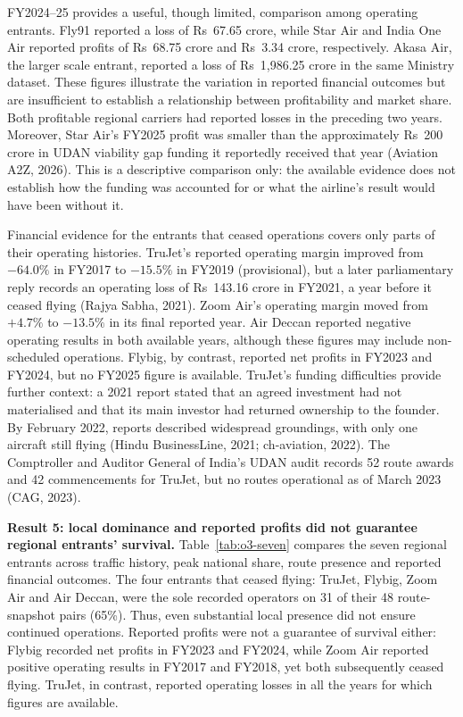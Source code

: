 \documentclass[12pt,a4paper]{article}
\newenvironment{authorcontribution}[1]{\par\begingroup\colorlet{currentAuthor}{#1}\color{#1}\captionsetup{font+={color=#1}}}{\par\endgroup}
\begin{document}
\begin{authorcontribution}{authorSweta}
FY2024--25 provides a useful, though limited, comparison among operating entrants. Fly91 reported a loss of Rs~67.65 crore, while Star Air and India One Air reported profits of Rs~68.75 crore and Rs~3.34 crore, respectively. Akasa Air, the larger scale entrant, reported a loss of Rs~1,986.25 crore in the same Ministry dataset. These figures illustrate the variation in reported financial outcomes but are insufficient to establish a relationship between profitability and market share. Both profitable regional carriers had reported losses in the preceding two years. Moreover, Star Air's FY2025 profit was smaller than the approximately Rs~200 crore in UDAN viability gap funding it reportedly received that year (Aviation A2Z, 2026). This is a descriptive comparison only: the available evidence does not establish how the funding was accounted for or what the airline's result would have been without it.

Financial evidence for the entrants that ceased operations covers only parts of their operating histories. TruJet's reported operating margin improved from $-64.0\%$ in FY2017 to $-15.5\%$ in FY2019 (provisional), but a later parliamentary reply records an operating loss of Rs~143.16 crore in FY2021, a year before it ceased flying (Rajya Sabha, 2021). Zoom Air's operating margin moved from $+4.7\%$ to $-13.5\%$ in its final reported year. Air Deccan reported negative operating results in both available years, although these figures may include non-scheduled operations. Flybig, by contrast, reported net profits in FY2023 and FY2024, but no FY2025 figure is available. TruJet's funding difficulties provide further context: a 2021 report stated that an agreed investment had not materialised and that its main investor had returned ownership to the founder. By February 2022, reports described widespread groundings, with only one aircraft still flying (Hindu BusinessLine, 2021; ch-aviation, 2022). The Comptroller and Auditor General of India's UDAN audit records 52 route awards and 42 commencements for TruJet, but no routes operational as of March 2023 (CAG, 2023).

\textbf{Result 5: local dominance and reported profits did not guarantee regional entrants' survival.} Table~\ref{tab:o3-seven} compares the seven regional entrants across traffic history, peak national share, route presence and reported financial outcomes. The four entrants that ceased flying: TruJet, Flybig, Zoom Air and Air Deccan, were the sole recorded operators on 31 of their 48 route-snapshot pairs (65\%). Thus, even substantial local presence did not ensure continued operations. Reported profits were not a guarantee of survival either: Flybig recorded net profits in FY2023 and FY2024, while Zoom Air reported positive operating results in FY2017 and FY2018, yet both subsequently ceased flying. TruJet, in contrast, reported operating losses in all the years for which figures are available.


\end{authorcontribution}
\end{document}
